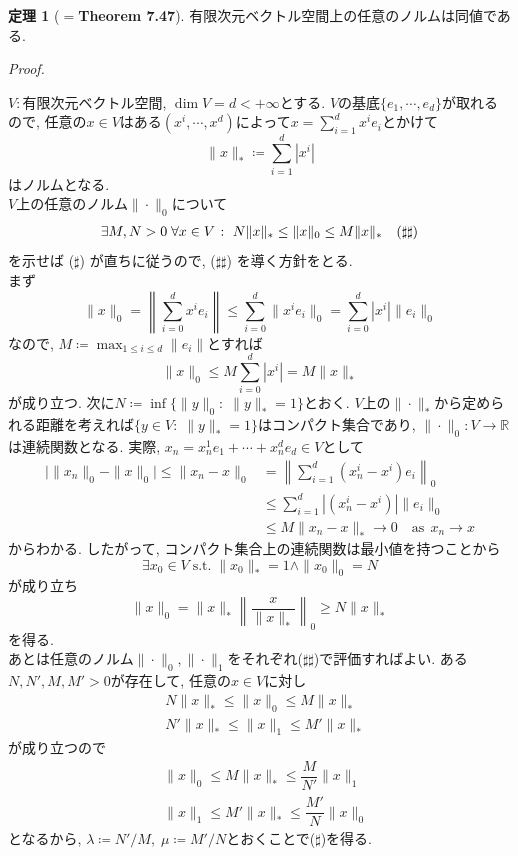 \documentclass{jsarticle}
\newcommand{\R}{\mathbb{R}}%
\renewenvironment{proof}[1][Proof]{%
\begin{proofbox}%
\textit{#1. }\ignorespaces
}{%
\hfill\qedsymbol%
\end{proofbox}%
}
\theoremstyle{definition}
\newtheorem{thm}{定理}[section]
\begin{document}
\begin{thm}[$=$\textbf{Theorem 7.47}]
有限次元ベクトル空間上の任意のノルムは同値である.
\end{thm}
\begin{proof}
$V\colon$有限次元ベクトル空間, $\dim V = d < +\infty$とする. $V$の基底$\{e_1, \cdots, e_d\}$が取れるので, 任意の$x\in V$はある$(x^i, \cdots, x^d)$によって$x=\sum_{i=1}^d x^i e_i$とかけて
\[
\|x\|_{*} \coloneq \sum_{i=1}^d |x^i|
\]
はノルムとなる. \\
\indent$V$上の任意のノルム$\|\cdot\|_0$について
\[
\begin{aligned}
&\exists M, N > 0\; \forall x\in V\;\colon\; N\|x\|_{*} \le \|x\|_0 \le M\|x\|_{*}\end{aligned}
\hfill (\sharp\sharp)
\]
を示せば ($\sharp$) が直ちに従うので, ($\sharp\sharp$) を導く方針をとる.\\
まず\[
\|x\|_0 = \left\|\sum_{i=0}^d x^ie_i\right\| \le \sum_{i=0}^d \|x^ie_i\|_0 = \sum_{i=0}^d  |x^i|\|e_i\|_0
\]
なので, $M \coloneq \max_{1 \le i \le d}\|e_i\|$とすれば
\[
\|x\|_0 \le M\sum_{i=0}^d  |x^i| = M\|x\|_{*}
\]
が成り立つ. 次に$N \coloneq \inf\{\|y\|_0\colon\; \|y\|_{*}=1\}$とおく. $V$上の$\|\cdot\|_{*}$から定められる距離を考えれば$\{y \in V\colon\; \|y\|_{*}=1\}$はコンパクト集合であり, $\|\cdot\|_0\colon V \to \R$は連続関数となる. 実際, $x_n = x_n^1e_1+\cdots+x_n^de_d \in V$として
\begin{align*}
\Big|\|x_n\|_0-\|x\|_0 \Big| \le \|x_n-x\|_0 &= \left\|\sum_{i=1}^d (x_n^i-x^i)e_i\right\|_0\\
& \le \sum_{i=1}^d |(x_n^i-x^i)|\|e_i\|_0\\
& \le M\|x_n-x\|_{*} \to 0 \hspace{1em} \text{as}\:\:x_n\to x
\end{align*}
からわかる. したがって, コンパクト集合上の連続関数は最小値を持つことから
\[
\exists x_0 \in V\;\text{s.t.}\;\|x_0\|_{*}=1 \land \|x_0\|_0 = N 
\]
が成り立ち
\[
\|x\|_0 = \|x\|_{*}\left\| \dfrac{x}{\|x\|_{*}} \right\|_0 \ge N\|x\|_{*}
\]
を得る. \\
\indent あとは任意のノルム$\|\cdot\|_0, \|\cdot\|_1$をそれぞれ($\sharp\sharp$)で評価すればよい. ある$N, N', M, M' > 0$が存在して, 任意の$x\in V$に対し
\begin{align*}
&N\|x\|_{*} \le \|x\|_0 \le M\|x\|_{*}\\
&N'\|x\|_{*} \le \|x\|_1 \le M'\|x\|_{*}
\end{align*}
が成り立つので
\begin{align*}
&\|x\|_0 \le M\|x\|_{*} \le \dfrac{M}{N'}\|x\|_1\\
&\|x\|_1 \le M'\|x\|_{*} \le \dfrac{M'}{N}\|x\|_0
\end{align*}
となるから, $\lambda\coloneq {N'}/{M},\;\mu\coloneq {M'}/{N}$とおくことで($\sharp$)を得る.

\end{proof}
\end{document}
